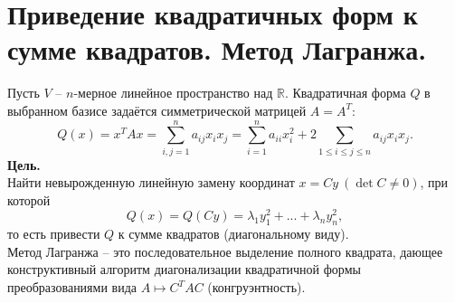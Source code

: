\documentclass[14pt]{extreport}
\begin{document}
    \chapter{Приведение квадратичных форм к сумме квадратов. Метод Лагранжа.}

    \begin{thbox}
        Пусть $V$ – $n$-мерное линейное пространство над $\mathbb{R}$. Квадратичная форма $Q$ в выбранном базисе задаётся симметрической матрицей $A = A^T$:
        \[
        Q(x) = x^TAx = \sum_{i,j=1}^n a_{ij}x_ix_j = \sum_{i=1}^n a_{ii}x_i^2 + 2\sum_{1 \leq i \leq j \leq n} a_{ij}x_ix_j.
        \]
        \textbf{Цель.}\\
        Найти невырожденную линейную замену координат $x = Cy\ (\det C \neq 0)$, при которой
        \[
        Q(x) = Q(Cy) = \lambda_1y_1^2 + ... + \lambda_ny_n^2,
        \]
        то есть привести $Q$ к сумме квадратов (диагональному виду).\\
        Метод Лагранжа – это последовательное выделение полного квадрата, дающее конструктивный алгоритм диагонализации квадратичной формы преобразованиями вида $A \mapsto C^TAC$ (конгруэнтность).
    \end{thbox}
\end{document}
